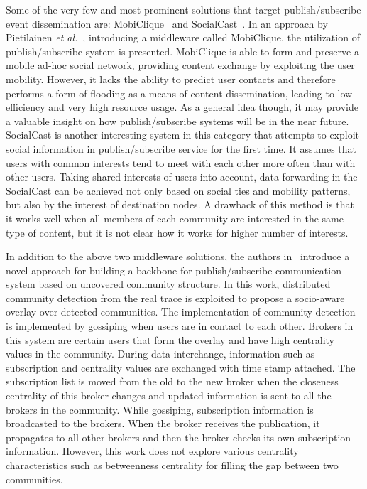 Some of the very few and most prominent solutions that target publish/subscribe event dissemination are: MobiClique~\cite{AKPietilainen2009} and SocialCast~\cite{PCosta2008}. In an approach by Pietilainen {\it et al.}~\cite{AKPietilainen2009}, introducing a middleware called MobiClique, the utilization of publish/subscribe system is presented. MobiClique is able to form and preserve a mobile ad-hoc social network, providing content exchange by exploiting the user mobility. However, it lacks the ability to predict user contacts and therefore performs a form of flooding as a means of content dissemination, leading to low efficiency and very high resource usage. As a general idea though, it may provide a valuable insight on how publish/subscribe systems will be in the near future. SocialCast is another interesting system in this category that attempts to exploit social information in publish/subscribe service for the first time. It assumes that users with common interests tend to meet with each other more often than with other users. Taking shared interests of users into account, data forwarding in the SocialCast can be achieved not only based on social ties and mobility patterns, but also by the interest of destination nodes. A drawback of this method is that it works well when all members of each community are interested in the same type of content, but it is not clear how it works for higher number of interests.

In addition to the above two middleware solutions, the authors in~\cite{EYoneki2007} introduce a novel approach for building a backbone for publish/subscribe communication system based on uncovered community structure. In this work, distributed community detection from the real trace is exploited to propose a socio-aware overlay over detected communities. The implementation of community detection is implemented by gossiping when users are in contact to each other. Brokers in this system are certain users that form the overlay and have high centrality values in the community. During data interchange, information such as subscription and centrality values are exchanged with time stamp attached. The subscription list is moved from the old to the new broker when the closeness centrality of this broker changes and updated information is sent to all the brokers in the community. While gossiping, subscription information is broadcasted to the brokers. When the broker receives the publication, it propagates to all other brokers and then the broker checks its own subscription information. However, this work does not explore various centrality characteristics such as betweenness centrality for filling the gap between two communities.

